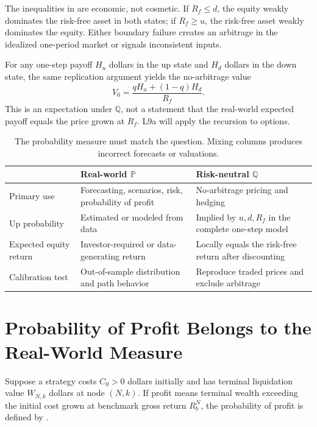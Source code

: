 \documentclass[11pt]{article}
\newcommand{\Pmeasure}{\mathbb{P}}
\newcommand{\Qmeasure}{\mathbb{Q}}
\begin{document}
The inequalities in  are economic, not cosmetic. If $R_f\leq d$, the equity weakly dominates the risk-free asset in both states; if $R_f\geq u$, the risk-free asset weakly dominates the equity. Either boundary failure creates an arbitrage in the idealized one-period market or signals inconsistent inputs.

For any one-step payoff $H_u$ dollars in the up state and $H_d$ dollars in the down state, the same replication argument yields the no-arbitrage value
\begin{equation}
  \label{eq:one-step-claim}
  V_0=\frac{qH_u+(1-q)H_d}{R_f}.
\end{equation}
This is an expectation under $\Qmeasure$, not a statement that the real-world expected payoff equals the price grown at $R_f$. L9a will apply the recursion to options.

\begin{table}[ht]
  \centering
  \caption{The probability measure must match the question. Mixing columns produces incorrect forecasts or valuations.}
  \label{tab:measures}
  \small\sffamily
  \renewcommand{\arraystretch}{1.2}
  \begin{tabular}{@{}p{}p{}p{}@{}}
    \hline
    & \textbf{Real-world $\Pmeasure$} & \textbf{Risk-neutral $\Qmeasure$} \\
    \hline
    Primary use & Forecasting, scenarios, risk, probability of profit & No-arbitrage pricing and hedging \\
    Up probability & Estimated or modeled from data & Implied by $u,d,R_f$ in the complete one-step model \\
    Expected equity return & Investor-required or data-generating return & Locally equals the risk-free return after discounting \\
    Calibration test & Out-of-sample distribution and path behavior & Reproduce traded prices and exclude arbitrage \\
    \hline
  \end{tabular}
\end{table}

\section{Probability of Profit Belongs to the Real-World Measure}

Suppose a strategy costs $C_0>0$ dollars initially and has terminal liquidation value $W_{N,k}$ dollars at node $(N,k)$. If profit means terminal wealth exceeding the initial cost grown at benchmark gross return $R_b^N$, the probability of profit is defined by .
\end{document}
